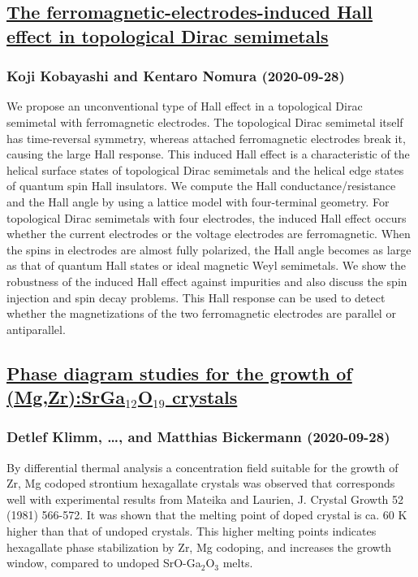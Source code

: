 \subsection*{\href{http://arxiv.org/abs/2009.13195v1}{The ferromagnetic-electrodes-induced Hall effect in topological Dirac  semimetals}}
\subsubsection*{Koji Kobayashi and Kentaro Nomura (2020-09-28)}
We propose an unconventional type of Hall effect in a topological Dirac
semimetal with ferromagnetic electrodes. The topological Dirac semimetal itself
has time-reversal symmetry, whereas attached ferromagnetic electrodes break it,
causing the large Hall response. This induced Hall effect is a characteristic
of the helical surface states of topological Dirac semimetals and the helical
edge states of quantum spin Hall insulators. We compute the Hall
conductance/resistance and the Hall angle by using a lattice model with
four-terminal geometry. For topological Dirac semimetals with four electrodes,
the induced Hall effect occurs whether the current electrodes or the voltage
electrodes are ferromagnetic. When the spins in electrodes are almost fully
polarized, the Hall angle becomes as large as that of quantum Hall states or
ideal magnetic Weyl semimetals. We show the robustness of the induced Hall
effect against impurities and also discuss the spin injection and spin decay
problems. This Hall response can be used to detect whether the magnetizations
of the two ferromagnetic electrodes are parallel or antiparallel.

\subsection*{\href{http://arxiv.org/abs/2009.13191v1}{Phase diagram studies for the growth of (Mg,Zr):SrGa$_{12}$O$_{19}$  crystals}}
\subsubsection*{Detlef Klimm, \dots, and Matthias Bickermann (2020-09-28)}
By differential thermal analysis a concentration field suitable for the
growth of Zr, Mg codoped strontium hexagallate crystals was observed that
corresponds well with experimental results from Mateika and Laurien, J. Crystal
Growth 52 (1981) 566-572. It was shown that the melting point of doped crystal
is ca. 60 K higher than that of undoped crystals. This higher melting points
indicates hexagallate phase stabilization by Zr, Mg codoping, and increases the
growth window, compared to undoped SrO-Ga$_2$O$_3$ melts.

